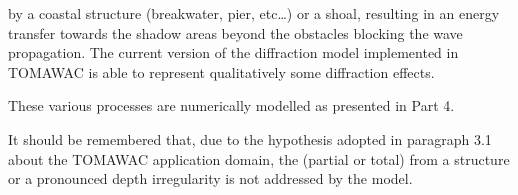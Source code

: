   by a coastal structure (breakwater, pier, etc\dots ) or a shoal, resulting in an energy transfer towards the shadow areas beyond the obstacles blocking the wave propagation. The current version of the diffraction model implemented in TOMAWAC is able to represent qualitatively some diffraction effects.

 These various processes are numerically modelled as presented in Part 4.

 It should be remembered that, due to the hypothesis adopted in paragraph 3.1 about the TOMAWAC application domain, the (partial or total) from a structure or a pronounced depth irregularity is not addressed by the model.

